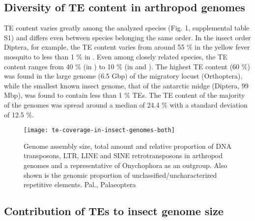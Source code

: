 \subsection{Diversity of TE content in arthropod
genomes}\label{diversity-of-te-content-in-arthropod-genomes}

TE content varies greatly among the analyzed species (Fig. 1,
supplemental table S1) and differs even between species belonging the
same order. In the insect order Diptera, for example, the TE content
varies from around 55 \% in the yellow fever mosquito  to less than 1 \% in . Even among
closely related  species, the TE content ranges from
40 \% (in ) to 10 \% (in  and
). The highest TE content (60 \%) was found in the
large genome (6.5 Gbp) of the migratory locust  (Orthoptera), while the smallest known insect genome, that
of the antarctic midge  (Diptera, 99 Mbp),
was found to contain less than 1 \% TEs. The TE content of the majority
of the genomes was spread around a median of 24.4 \% with a standard
deviation of 12.5 \%.

\begin{figure}[h!]
\begin{center}
\texttt{[image: te-coverage-in-insect-genomes-both]}
\caption[TE coverage in arthropod genomes]{{Genome assembly size, total
amount and relative proportion of DNA transposons, LTR, LINE and SINE
retrotransposons in arthropod genomes and a representative of
Onychophora as an outgroup. Also shown is the genomic proportion of
unclassified/uncharacterized repetitive elements.  Pal., Palaeoptera%
}}
\end{center}
\end{figure}

\subsection{Contribution of TEs to insect genome
size}\label{contribution-of-tes-to-insect-genome-size}


